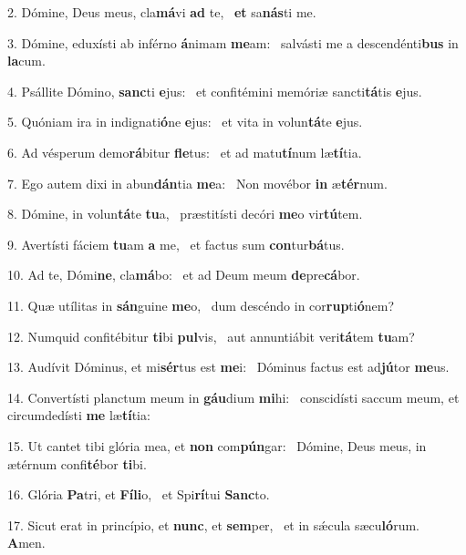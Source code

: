2. Dómine, Deus meus, cla\textbf{má}vi \textbf{ad} te, \ast\  \textbf{et} sa\textbf{nás}ti me.\

3. Dómine, eduxísti ab inférno \textbf{á}nimam \textbf{me}am: \ast\  salvásti me a descendénti\textbf{bus} in \textbf{la}cum.\

4. Psállite Dómino, \textbf{sanc}ti \textbf{e}jus: \ast\  et confitémini memóriæ sancti\textbf{tá}tis \textbf{e}jus.\

5. Quóniam ira in indignati\textbf{ó}ne \textbf{e}jus: \ast\  et vita in volun\textbf{tá}te \textbf{e}jus.\

6. Ad vésperum demo\textbf{rá}bitur \textbf{fle}tus: \ast\  et ad matu\textbf{tí}num læ\textbf{tí}tia.\

7. Ego autem dixi in abun\textbf{dán}tia \textbf{me}a: \ast\  Non movébor \textbf{in} æ\textbf{tér}num.\

8. Dómine, in volun\textbf{tá}te \textbf{tu}a, \ast\  præstitísti decóri \textbf{me}o vir\textbf{tú}tem.\

9. Avertísti fáciem \textbf{tu}am \textbf{a} me, \ast\  et factus sum \textbf{con}tur\textbf{bá}tus.\

10. Ad te, Dómi\textbf{ne}, cla\textbf{má}bo: \ast\  et ad Deum meum \textbf{de}pre\textbf{cá}bor.\

11. Quæ utílitas in \textbf{sán}guine \textbf{me}o, \ast\  dum descéndo in cor\textbf{rup}ti\textbf{ó}nem?\

12. Numquid confitébitur \textbf{ti}bi \textbf{pul}vis, \ast\  aut annuntiábit veri\textbf{tá}tem \textbf{tu}am?\

13. Audívit Dóminus, et mi\textbf{sér}tus est \textbf{me}i: \ast\  Dóminus factus est ad\textbf{jú}tor \textbf{me}us.\

14. Convertísti planctum meum in \textbf{gáu}dium \textbf{mi}hi: \ast\  conscidísti saccum meum, et circumdedísti \textbf{me} læ\textbf{tí}tia:\

15. Ut cantet tibi glória mea, et \textbf{non} com\textbf{pún}gar: \ast\  Dómine, Deus meus, in ætérnum confi\textbf{té}bor \textbf{ti}bi.\

16. Glória \textbf{Pa}tri, et \textbf{Fí}\textbf{li}o, \ast\  et Spi\textbf{rí}tui \textbf{Sanc}to.\

17. Sicut erat in princípio, et \textbf{nunc}, et \textbf{sem}per, \ast\  et in sǽcula sæcu\textbf{ló}rum. \textbf{A}men.\

